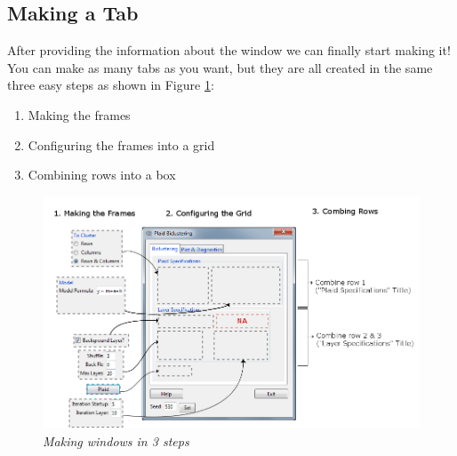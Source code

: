 \documentclass[a4paper]{article}\usepackage[]{graphicx}\usepackage[]{color}
\begin{document}
\subsection{Making a Tab}
After providing the information about the window we can finally start making
it! You can make as many tabs as you want, but they are all created in the same
three easy steps as shown in Figure \ref{3steps}:
\begin{enumerate}
\item Making the frames
\item Configuring the frames into a grid
\item Combining rows into a box
\end{enumerate}

\begin{figure}[H]
\centering
\includegraphics[width=\linewidth]{figures/3steps.png}
\caption{{\it Making windows in 3 steps}
\label{3steps}}
\end{figure}
\end{document}
